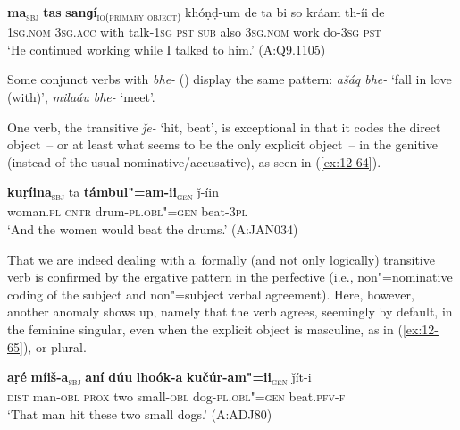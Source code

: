 \begin{exe}
\ex
\label{ex:12-63}
\gll {\ob}\textbf{ma}{\cb}\textsubscript{\textsc{\upshape sbj}} {\ob}\textbf{tas} \textbf{sanɡí}{\cb}\textsubscript{\textsc{\upshape io(primary object)}} khóṇḍ-um de ta bi so kráam th-íi de \\
\textsc{1sg.nom} \textsc{3sg.acc} with talk-\textsc{1sg} \textsc{pst}  \textsc{sub} also \textsc{3sg.nom} work do-\textsc{3sg} \textsc{pst} \\
\glt `He continued working while I talked to him.' (A:Q9.1105)
\end{exe}

Some conjunct verbs with \textit{bhe-} () display the same pattern: \textit{ašáq bhe-} `fall in love (with)', \textit{milaáu bhe-} `meet'.


 One verb, the transitive \textit{ǰe-} `hit, beat', is exceptional in that it codes the direct object~-- or at least what seems to be the only explicit object~-- in the genitive (instead of the usual nominative/accusative), as seen in (\ref{ex:12-64}).

\begin{exe}
\ex
\label{ex:12-64}
\gll {\ob}\textbf{kuṛíina}{\cb}\textsubscript{\textsc{\upshape sbj}} ta {\ob}\textbf{támbul"=am-ii}{\cb}\textsubscript{\textsc{\upshape gen}} ǰ-íin  \\
woman.\textsc{pl} \textsc{cntr} drum-\textsc{pl.obl"=gen} beat-\textsc{3pl}  \\
\glt `And the women would beat the drums.' (A:JAN034)
\end{exe}

That we are indeed dealing with a~formally (and not only logically) transitive verb is confirmed by the ergative pattern in the perfective (i.e., non"=nominative coding of the subject and non"=subject verbal agreement). Here, however, another anomaly shows up, namely that the verb agrees, seemingly by default, in the feminine singular, even when the explicit object is masculine, as in (\ref{ex:12-65}), or plural.

\begin{exe}
\ex
\label{ex:12-65}
\gll {\ob}\textbf{aṛé} \textbf{míiš-a}{\cb}\textsubscript{\textsc{\upshape sbj}} {\ob}\textbf{aní} \textbf{dúu} \textbf{lhoók-a} \textbf{kučúr-am"=ii}{\cb}\textsubscript{\textsc{\upshape gen}} ǰít-i\\
\textsc{dist} man-\textsc{obl} \textsc{prox} two small-\textsc{obl} dog-\textsc{pl.obl"=gen} beat.\textsc{pfv-f}\\
\glt `That man hit these two small dogs.' (A:ADJ80)
\end{exe}

